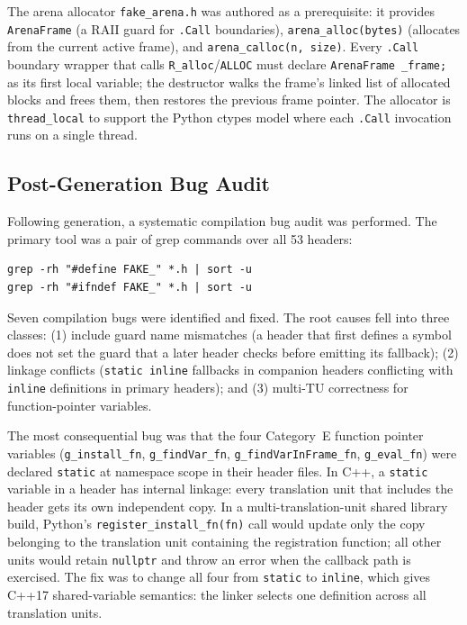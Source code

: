 \documentclass[12pt]{article}
\begin{document}
The arena allocator \texttt{fake\_arena.h} was authored as a prerequisite: it provides \texttt{ArenaFrame} (a RAII guard for \texttt{.Call} boundaries), \texttt{arena\_alloc(bytes)} (allocates from the current active frame), and \texttt{arena\_calloc(n, size)}. Every \texttt{.Call} boundary wrapper that calls \texttt{R\_alloc}/\texttt{ALLOC} must declare \texttt{ArenaFrame \_frame;} as its first local variable; the destructor walks the frame's linked list of allocated blocks and frees them, then restores the previous frame pointer. The allocator is \texttt{thread\_local} to support the Python ctypes model where each \texttt{.Call} invocation runs on a single thread.

\subsection{Post-Generation Bug Audit}

Following generation, a systematic compilation bug audit was performed. The primary tool was a pair of grep commands over all 53 headers:
\begin{lstlisting}[style=bash]
grep -rh "#define FAKE_" *.h | sort -u
grep -rh "#ifndef FAKE_" *.h | sort -u
\end{lstlisting}

Seven compilation bugs were identified and fixed. The root causes fell into three classes: (1) include guard name mismatches (a header that first defines a symbol does not set the guard that a later header checks before emitting its fallback); (2) linkage conflicts (\texttt{static inline} fallbacks in companion headers conflicting with \texttt{inline} definitions in primary headers); and (3) multi-TU correctness for function-pointer variables.

The most consequential bug was that the four Category~E function pointer variables (\texttt{g\_install\_fn}, \texttt{g\_findVar\_fn}, \texttt{g\_findVarInFrame\_fn}, \texttt{g\_eval\_fn}) were declared \texttt{static} at namespace scope in their header files. In C++, a \texttt{static} variable in a header has internal linkage: every translation unit that includes the header gets its own independent copy. In a multi-translation-unit shared library build, Python's \texttt{register\_install\_fn(fn)} call would update only the copy belonging to the translation unit containing the registration function; all other units would retain \texttt{nullptr} and throw an error when the callback path is exercised. The fix was to change all four from \texttt{static} to \texttt{inline}, which gives C++17 shared-variable semantics: the linker selects one definition across all translation units.
\end{document}
